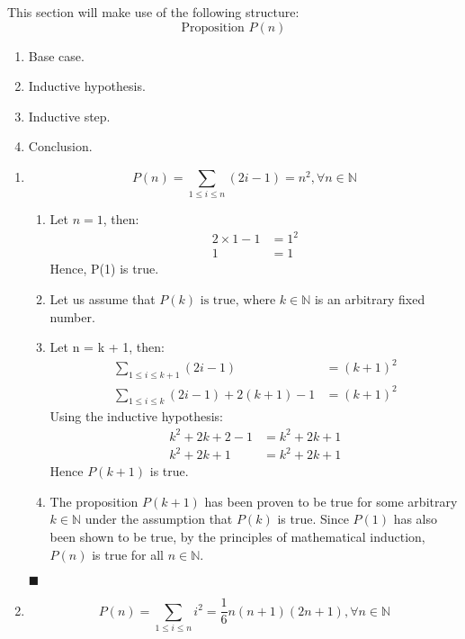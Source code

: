 \documentclass[12pt]{article}
\newcommand{\p}[1]{\item[\textnormal{(#1)}]}
\newcommand{\q}{\hfill $\blacksquare$}
\newenvironment{ps}
{\begin{enumerate}[leftmargin=0em, itemindent=1.5em]}
{\end{enumerate}}
\begin{document}
This section will make use of the following structure:
\[
    \text{Proposition } P(n)
\]   

\begin{enumerate}
    \item Base case.
    \item Inductive hypothesis.
    \item Inductive step.
    \item Conclusion.
\end{enumerate}

\begin{ps}

    \p{a} \[ P(n) = \sum_{1 \leq i \leq n} (2i - 1) = n^2, \forall n \in \mathbb{N} \]
    \begin{enumerate}[label=\arabic*.]
        \item Let \( n = 1 \), then: 
        \begin{align*}
            2 \times 1 - 1 &= 1^2 \\
            1 &= 1
        \end{align*}
        Hence, P(1) is true.

    \item Let us assume that \( P(k) \text{ is true, where } k \in \mathbb{N} \) is an arbitrary
        fixed number.

    \item Let n = k + 1, then:
    \begin{align*}
        \sum_{1 \leq i \leq k+1} (2i-1) &= (k+1)^2 \\
        \sum_{1 \leq i \leq k} (2i-1) + 2(k+1) - 1 &= (k+1)^2 
    \end{align*}
    Using the inductive hypothesis:
    \begin{align*}
            k^2 + 2k + 2 - 1 &= k^2 + 2k + 1 \\
            k^2 + 2k + 1 &= k^2 + 2k + 1
    \end{align*}
    Hence \( P(k+1) \) is true.

    \item The proposition \( P(k+1) \) has been proven to be true for some arbitrary \( k \in
        \mathbb{N} \) under the assumption that \( P(k) \) is true. Since \( P(1) \) has also been
        shown to be true, by the principles of mathematical induction, \( P(n) \) is true for all \( n \in
        \mathbb{N} \).

    \end{enumerate} \q

    \p{b} \[ P(n) = \sum_{1 \leq i \leq n} i^2 = \frac{1}{6}n(n+1)(2n+1), \forall n \in
    \mathbb{N} \]


\end{ps}
\end{document}
